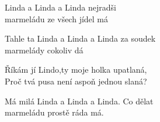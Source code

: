
\ve{}
Linda a Linda a Linda nejradši\\
marmeládu ze všech jídel má

\ve{}
Tahle ta Linda a Linda a Linda za soudek\\
marmelády cokoliv dá

\ve{}
Říkám jí Lindo,ty moje holka upatlaná,\\
Proč tvá pusa není aspoň jednou slaná?

\ve{}
Má milá Linda a Linda a Linda. Co dělat\\
marmeládu prostě ráda má.

\re{}

\esong{}